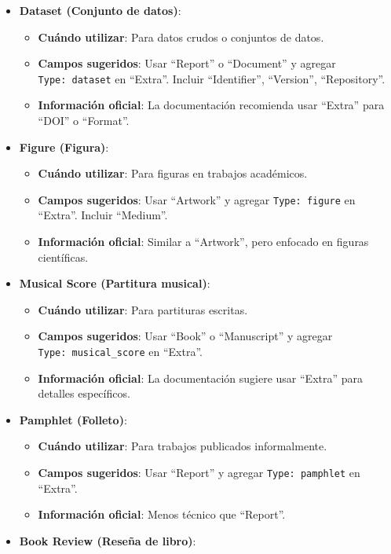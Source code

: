 \documentclass[
  jou,
  floatsintext,
  longtable,
  a4paper,
  nolmodern,
  notxfonts,
  notimes,
  12pt,
  colorlinks=true,linkcolor=blue,citecolor=blue,urlcolor=blue]{apa7}
\providecommand{\tightlist}{%
  \setlength{\itemsep}{0pt}\setlength{\parskip}{0pt}}
\begin{document}
\begin{itemize}
\tightlist
\item
  \textbf{Dataset (Conjunto de datos)}:

  \begin{itemize}
  \tightlist
  \item
    \textbf{Cuándo utilizar}: Para datos crudos o conjuntos de datos.
  \item
    \textbf{Campos sugeridos}: Usar ``Report'' o ``Document'' y agregar
    \texttt{Type:\ dataset} en ``Extra''. Incluir ``Identifier'',
    ``Version'', ``Repository''.
  \item
    \textbf{Información oficial}: La documentación recomienda usar
    ``Extra'' para ``DOI'' o ``Format''.
  \end{itemize}
\item
  \textbf{Figure (Figura)}:

  \begin{itemize}
  \tightlist
  \item
    \textbf{Cuándo utilizar}: Para figuras en trabajos académicos.
  \item
    \textbf{Campos sugeridos}: Usar ``Artwork'' y agregar
    \texttt{Type:\ figure} en ``Extra''. Incluir ``Medium''.
  \item
    \textbf{Información oficial}: Similar a ``Artwork'', pero enfocado
    en figuras científicas.
  \end{itemize}
\item
  \textbf{Musical Score (Partitura musical)}:

  \begin{itemize}
  \tightlist
  \item
    \textbf{Cuándo utilizar}: Para partituras escritas.
  \item
    \textbf{Campos sugeridos}: Usar ``Book'' o ``Manuscript'' y agregar
    \texttt{Type:\ musical\_score} en ``Extra''.
  \item
    \textbf{Información oficial}: La documentación sugiere usar
    ``Extra'' para detalles específicos.
  \end{itemize}
\item
  \textbf{Pamphlet (Folleto)}:

  \begin{itemize}
  \tightlist
  \item
    \textbf{Cuándo utilizar}: Para trabajos publicados informalmente.
  \item
    \textbf{Campos sugeridos}: Usar ``Report'' y agregar
    \texttt{Type:\ pamphlet} en ``Extra''.
  \item
    \textbf{Información oficial}: Menos técnico que ``Report''.
  \end{itemize}
\item
  \textbf{Book Review (Reseña de libro)}:


\end{itemize}
\end{document}
